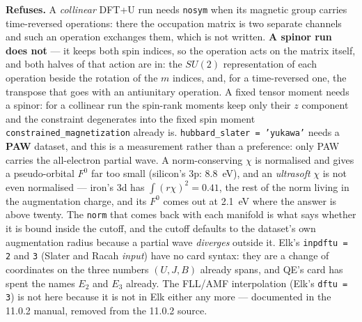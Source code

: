 \documentclass[11pt,a4paper]{article}
\newcommand{\code}[1]{\texttt{\small #1}}
\begin{document}
\begin{refuses}
\textbf{Refuses.} A \emph{collinear} DFT+U run needs \code{nosym} when its
magnetic group carries time-reversed operations: there the occupation matrix is
two separate channels and such an operation exchanges them, which is not
written. \textbf{A spinor run does not} --- it keeps both spin indices, so the
operation acts on the matrix itself, and both halves of that action are in: the
$SU(2)$ representation of each operation beside the rotation of the $m$ indices,
and, for a time-reversed one, the transpose that goes with an antiunitary
operation. A fixed tensor moment needs a spinor: for a collinear
run the spin-rank moments keep only their $z$ component and the constraint
degenerates into the fixed spin moment \code{constrained\_magnetization}
already is. \code{hubbard\_slater = 'yukawa'} needs a \textbf{PAW}
dataset, and this is a measurement rather than a preference: only PAW carries
the all-electron partial wave. A norm-conserving $\chi$ is normalised and gives
a pseudo-orbital $F^0$ far too small (silicon's 3p: 8.8~eV), and an
\emph{ultrasoft} $\chi$ is not even normalised --- iron's 3d has
$\int (r\chi)^2 = 0.41$, the rest of the norm living in the augmentation charge,
and its $F^0$ comes out at 2.1~eV where the answer is above twenty. The
\code{norm} that comes back with each manifold is what says whether it is bound
inside the cutoff, and the cutoff defaults to the dataset's own augmentation
radius because a partial wave \emph{diverges} outside it. Elk's
\code{inpdftu = 2} and \code{3} (Slater and Racah \emph{input}) have no card
syntax: they are a change of coordinates on the three numbers $(U, J, B)$
already spans, and QE's card has spent the names $E_2$ and $E_3$ already. The
FLL/AMF interpolation (Elk's \code{dftu = 3}) is not here because it is not in
Elk either any more --- documented in the 11.0.2 manual, removed from the 11.0.2
source.
\end{refuses}
\end{document}
